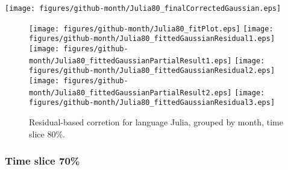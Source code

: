 \begin{center}
{\texttt{[image: figures/github-month/Julia80\_finalCorrectedGaussian.eps]}}
\end{center}

\FloatBarrier

\begin{figure}[t]
\centering
{}
{\texttt{[image: figures/github-month/Julia80\_fitPlot.eps]}}
{\texttt{[image: figures/github-month/Julia80\_fittedGaussianResidual1.eps]}}
{\texttt{[image: figures/github-month/Julia80\_fittedGaussianPartialResult1.eps]}}
{\texttt{[image: figures/github-month/Julia80\_fittedGaussianResidual2.eps]}}
{\texttt{[image: figures/github-month/Julia80\_fittedGaussianPartialResult2.eps]}}
{\texttt{[image: figures/github-month/Julia80\_fittedGaussianResidual3.eps]}}
\caption{Residual-based corretion for language Julia, grouped by month, time slice 80\%.}
\end{figure}


\FloatBarrier


\subsubsection{Time slice 70\%}

